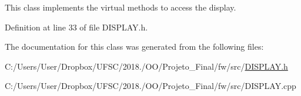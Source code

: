 This class implements the virtual methods to access the display. 

Definition at line 33 of file D\+I\+S\+P\+L\+A\+Y.\+h.



The documentation for this class was generated from the following files\+:\begin{DoxyCompactItemize}
\item 
C\+:/\+Users/\+User/\+Dropbox/\+U\+F\+S\+C/2018./\+O\+O/\+Projeto\+\_\+\+Final/fw/src/\mbox{\hyperlink{_d_i_s_p_l_a_y_8h}{D\+I\+S\+P\+L\+A\+Y.\+h}}\item 
C\+:/\+Users/\+User/\+Dropbox/\+U\+F\+S\+C/2018./\+O\+O/\+Projeto\+\_\+\+Final/fw/src/D\+I\+S\+P\+L\+A\+Y.\+cpp\end{DoxyCompactItemize}
